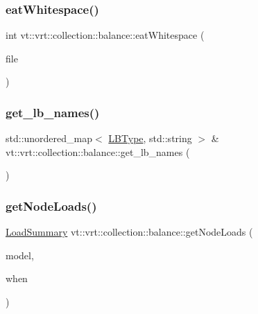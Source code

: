 \mbox{\label{namespacevt_1_1vrt_1_1collection_1_1balance_a605ea184edf7f99b0022f960f71bf4d4}} 
\subsubsection{\texorpdfstring{eat\+Whitespace()}{eatWhitespace()}}
{\footnotesize\ttfamily int vt\+::vrt\+::collection\+::balance\+::eat\+Whitespace (\begin{DoxyParamCaption}\item[{std\+::ifstream \&}]{file }\end{DoxyParamCaption})}

\mbox{\label{namespacevt_1_1vrt_1_1collection_1_1balance_ab24424d5cc677e1c6dfe67d5e03efc70}} 
\subsubsection{\texorpdfstring{get\+\_\+lb\+\_\+names()}{get\_lb\_names()}}
{\footnotesize\ttfamily std\+::unordered\+\_\+map$<$ \hyperlink{namespacevt_1_1vrt_1_1collection_1_1balance_ac4f99693509affcc67db182d4aad9b5c}{L\+B\+Type}, std\+::string $>$ \& vt\+::vrt\+::collection\+::balance\+::get\+\_\+lb\+\_\+names (\begin{DoxyParamCaption}{ }\end{DoxyParamCaption})}

\mbox{\label{namespacevt_1_1vrt_1_1collection_1_1balance_a3e23892df34e34f78bfa995cad0aa98e}} 
\subsubsection{\texorpdfstring{get\+Node\+Loads()}{getNodeLoads()}}
{\footnotesize\ttfamily \hyperlink{structvt_1_1vrt_1_1collection_1_1balance_1_1_load_summary}{Load\+Summary} vt\+::vrt\+::collection\+::balance\+::get\+Node\+Loads (\begin{DoxyParamCaption}\item[{std\+::shared\+\_\+ptr$<$ \hyperlink{structvt_1_1vrt_1_1collection_1_1balance_1_1_load_model}{Load\+Model} $>$}]{model,  }\item[{\hyperlink{structvt_1_1vrt_1_1collection_1_1balance_1_1_phase_offset}{Phase\+Offset}}]{when }\end{DoxyParamCaption})}

